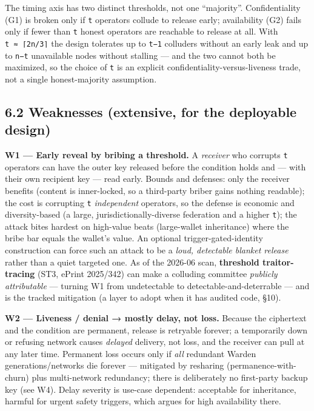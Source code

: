 \documentclass[
  11pt,
]{article}
\begin{document}
The timing axis has two distinct thresholds, not one ``majority''.
Confidentiality (G1) is broken only if \texttt{t} operators collude to
release early; availability (G2) fails only if fewer than \texttt{t}
honest operators are reachable to release at all. With
\texttt{t\ ≈\ ⌈2n/3⌉} the design tolerates up to \texttt{t−1} colluders
without an early leak and up to \texttt{n−t} unavailable nodes without
stalling --- and the two cannot both be maximized, so the choice of
\texttt{t} is an explicit confidentiality-versus-liveness trade, not a
single honest-majority assumption.

\subsection{6.2 Weaknesses (extensive, for the deployable
design)}\label{weaknesses-extensive-for-the-deployable-design}

\textbf{W1 --- Early reveal by bribing a threshold.} A \emph{receiver}
who corrupts \texttt{t} operators can have the outer key released before
the condition holds and --- with their own recipient key --- read early.
Bounds and defenses: only the receiver benefits (content is
inner-locked, so a third-party briber gains nothing readable); the cost
is corrupting \texttt{t} \emph{independent} operators, so the defense is
economic and diversity-based (a large, jurisdictionally-diverse
federation and a higher \texttt{t}); the attack bites hardest on
high-value beats (large-wallet inheritance) where the bribe bar equals
the wallet's value. An optional trigger-gated-identity construction can
force such an attack to be a \emph{loud, detectable blanket release}
rather than a quiet targeted one. As of the 2026-06 scan,
\textbf{threshold traitor-tracing} (ST3, ePrint 2025/342) can make a
colluding committee \emph{publicly attributable} --- turning W1 from
undetectable to detectable-and-deterrable --- and is the tracked
mitigation (a layer to adopt when it has audited code, §10).

\textbf{W2 --- Liveness / denial → mostly delay, not loss.} Because the
ciphertext and the condition are permanent, release is retryable
forever; a temporarily down or refusing network causes \emph{delayed}
delivery, not loss, and the receiver can pull at any later time.
Permanent loss occurs only if \emph{all} redundant Warden
generations/networks die forever --- mitigated by resharing
(permanence-with-churn) plus multi-network redundancy; there is
deliberately no first-party backup key (see W4). Delay severity is
use-case dependent: acceptable for inheritance, harmful for urgent
safety triggers, which argues for high availability there.
\end{document}

